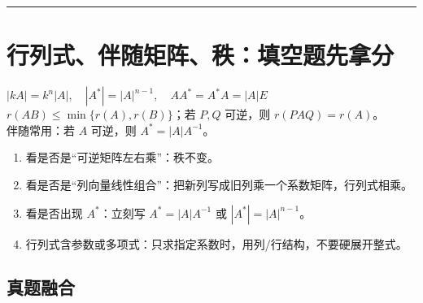 ﻿\documentclass[11pt,a4paper,UTF8]{ctexart}
\begin{document}
\bigskip\hrule\bigskip

\section{行列式、伴随矩阵、秩：填空题先拿分}

\begin{identifybox}[高亮公式]
$|kA|=k^n|A|,\quad |A^*|=|A|^{n-1},\quad AA^*=A^*A=|A|E$\\
$r(AB)\le \min\{r(A),r(B)\}$；若 $P,Q$ 可逆，则 $r(PAQ)=r(A)$。\\
伴随常用：若 $A$ 可逆，则 $A^*=|A|A^{-1}$。\\
\end{identifybox}

\begin{templatebox}[考场模板]

\begin{enumerate}
\item 看是否是“可逆矩阵左右乘”：秩不变。
\item 看是否是“列向量线性组合”：把新列写成旧列乘一个系数矩阵，行列式相乘。
\item 看是否出现 $A^*$：立刻写 $A^*=|A|A^{-1}$ 或 $|A^*|=|A|^{n-1}$。
\item 行列式含参数或多项式：只求指定系数时，用列/行结构，不要硬展开整式。
\end{enumerate}

\end{templatebox}
\subsection{真题融合}
\end{document}
